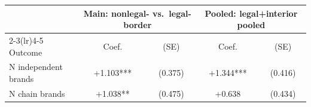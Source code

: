 \begin{tabular}{@{}lcccc@{}}
\toprule
 & \multicolumn{2}{c}{Main: nonlegal- vs.\ legal-border} & \multicolumn{2}{c}{Pooled: legal+interior pooled} \\
\cmidrule(lr){2-3}\cmidrule(lr){4-5}
Outcome & Coef. & (SE) & Coef. & (SE) \\
\midrule
N independent brands & +1.103*** & (0.375) & +1.344*** & (0.416) \\
N chain brands & +1.038** & (0.475) & +0.638 & (0.434) \\
\bottomrule
\end{tabular}
